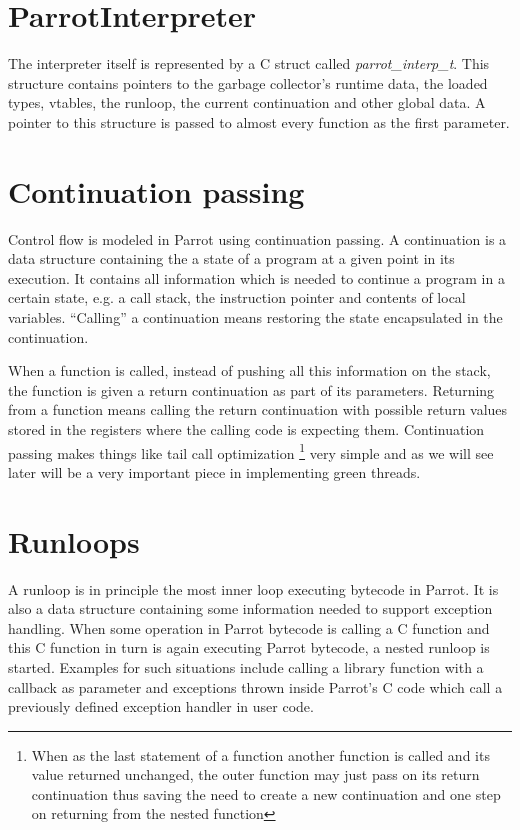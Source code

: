 \documentclass[bachelor,english]{hgbthesis}
\begin{document}
\section{ParrotInterpreter}

The interpreter itself is represented by a C struct called \textit{parrot\_interp\_t}. This structure contains pointers to the garbage collector's runtime data, the loaded types, vtables, the runloop, the current continuation and other global data. A pointer to this structure is passed to almost every function as the first parameter.

\section{Continuation passing}

Control flow is modeled in Parrot using continuation passing. A continuation is a data structure containing the a state of a program at a given point in its execution. It contains all information which is needed to continue a program in a certain state, e.g. a call stack, the instruction pointer and contents of local variables. ``Calling'' a continuation means restoring the state encapsulated in the continuation.

When a function is called, instead of pushing all this information on the stack, the function is given a return continuation as part of its parameters. Returning from a function means calling the return continuation with possible return values stored in the registers where the calling code is expecting them. Continuation passing makes things like tail call optimization \footnote{When as the last statement of a function another function is called and its value returned unchanged, the outer function may just pass on its return continuation thus saving the need to create a new continuation and one step on returning from the nested function} very simple and as we will see later will be a very important piece in implementing green threads.

\section{Runloops}
\label{sec:Runloops}

A runloop is in principle the most inner loop executing bytecode in Parrot. It is also a data structure containing some information needed to support exception handling. When some operation in Parrot bytecode is calling a C function and this C function in turn is again executing Parrot bytecode, a nested runloop is started. Examples for such situations include calling a library function with a callback as parameter and exceptions thrown inside Parrot's C code which call a previously defined exception handler in user code.
\end{document}

